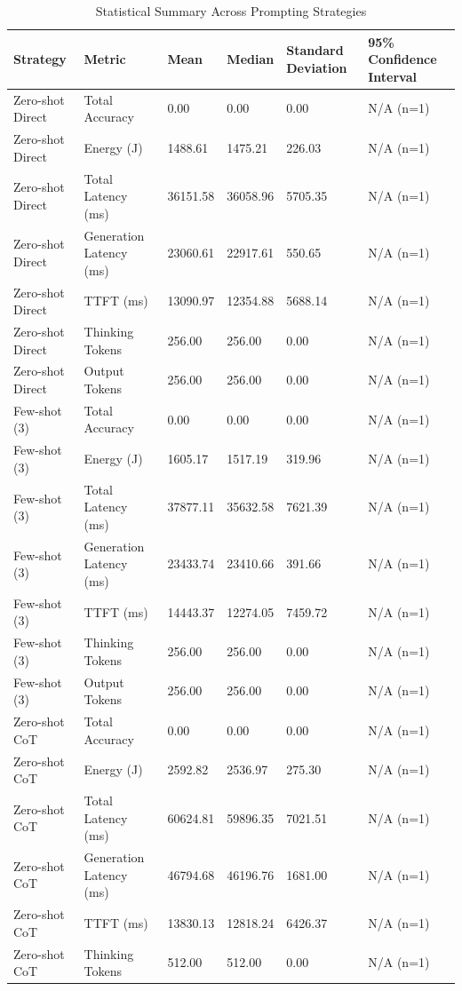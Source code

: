 \begin{table}
\caption{Statistical Summary Across Prompting Strategies}
\label{tab:statistical_summary}
\begin{tabular}{llllll}
\toprule
Strategy & Metric & Mean & Median & Standard Deviation & 95\% Confidence Interval \\
\midrule
Zero-shot Direct & Total Accuracy & 0.00 & 0.00 & 0.00 & N/A (n=1) \\
Zero-shot Direct & Energy (J) & 1488.61 & 1475.21 & 226.03 & N/A (n=1) \\
Zero-shot Direct & Total Latency (ms) & 36151.58 & 36058.96 & 5705.35 & N/A (n=1) \\
Zero-shot Direct & Generation Latency (ms) & 23060.61 & 22917.61 & 550.65 & N/A (n=1) \\
Zero-shot Direct & TTFT (ms) & 13090.97 & 12354.88 & 5688.14 & N/A (n=1) \\
Zero-shot Direct & Thinking Tokens & 256.00 & 256.00 & 0.00 & N/A (n=1) \\
Zero-shot Direct & Output Tokens & 256.00 & 256.00 & 0.00 & N/A (n=1) \\
Few-shot (3) & Total Accuracy & 0.00 & 0.00 & 0.00 & N/A (n=1) \\
Few-shot (3) & Energy (J) & 1605.17 & 1517.19 & 319.96 & N/A (n=1) \\
Few-shot (3) & Total Latency (ms) & 37877.11 & 35632.58 & 7621.39 & N/A (n=1) \\
Few-shot (3) & Generation Latency (ms) & 23433.74 & 23410.66 & 391.66 & N/A (n=1) \\
Few-shot (3) & TTFT (ms) & 14443.37 & 12274.05 & 7459.72 & N/A (n=1) \\
Few-shot (3) & Thinking Tokens & 256.00 & 256.00 & 0.00 & N/A (n=1) \\
Few-shot (3) & Output Tokens & 256.00 & 256.00 & 0.00 & N/A (n=1) \\
Zero-shot CoT & Total Accuracy & 0.00 & 0.00 & 0.00 & N/A (n=1) \\
Zero-shot CoT & Energy (J) & 2592.82 & 2536.97 & 275.30 & N/A (n=1) \\
Zero-shot CoT & Total Latency (ms) & 60624.81 & 59896.35 & 7021.51 & N/A (n=1) \\
Zero-shot CoT & Generation Latency (ms) & 46794.68 & 46196.76 & 1681.00 & N/A (n=1) \\
Zero-shot CoT & TTFT (ms) & 13830.13 & 12818.24 & 6426.37 & N/A (n=1) \\
Zero-shot CoT & Thinking Tokens & 512.00 & 512.00 & 0.00 & N/A (n=1) \\

\end{tabular}
\end{table}
